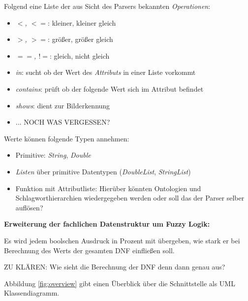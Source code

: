 \documentclass[a4paper,10pt,parskip=half]{scrartcl}
\begin{document}
Folgend eine Liste der aus Sicht des Parsers bekannten \textit{Operationen}:
\begin{itemize}
 \item \textit{$<$, $<=$}: kleiner, kleiner gleich
 \item \textit{$>$, $>=$}: größer, größer gleich
 \item \textit{$==$, $!=$}: gleich, nicht gleich
 \item \textit{in}: sucht ob der Wert des \textit{Attributs} in einer Liste 
    vorkommt
 \item \textit{contains}: prüft ob der folgende Wert sich im Attribut befindet
 \item \textit{shows}: dient zur Bilderkennung
 \item \color{red} ... NOCH WAS VERGESSEN? \color{black}
\end{itemize}

Werte können folgende Typen annehmen:
\begin{itemize}
 \item Primitive: \textit{String}, \textit{Double}
 \item \textit{Listen} über primitive Datentypen (\textit{DoubleList}, 
    \textit{StringList})
 \item Funktion mit Attributliste: Hierüber könnten Ontologien und 
    Schlagworthierarchien wiedergegeben werden \color{red} oder soll das der 
    Parser selber auflösen? \color{black}
\end{itemize}


\textbf{Erweiterung der fachlichen Datenstruktur um Fuzzy Logik:}

Es wird jedem boolschen Ausdruck in Prozent mit übergeben, 
wie stark er bei Berechnung des Werts der gesamten DNF einfließen soll.

\color{red}ZU KLÄREN: Wie sieht die Berechnung der DNF denn dann genau aus?
\color{black}

Abbildung \ref{fig:overview} gibt einen Überblick über die Schnittstelle als 
UML Klassendiagramm.
\end{document}
